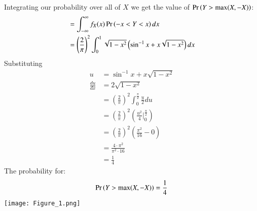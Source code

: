 \documentclass[journal,12pt,twocolumn]{IEEEtran}
\begin{document}
Integrating our probability over all of $X$ we get the value of $\Pr\left(Y>\text{max}(X,-X)\right)$:
\begin{align}
 &=\int_{-\infty}^{\infty}f_X(x)\Pr\left(-x<Y<x\right)dx\\
    &=\left(\frac{2}{\pi}\right)^2\int_0^1\sqrt{1-x^2}\left(\sin^{-1}{x} + x\sqrt{1-x^2}\right)dx
\end{align}
Substituting
\begin{align} 
u &= \sin^{-1}{x} + x\sqrt{1-x^2}\\
\frac{du}{dx} &= 2\sqrt{1-x^2}\\
&=\left(\frac{2}{\pi}\right)^2\int_0^{\frac{\pi}{2}}\frac{u}{2}du\\
&=\left(\frac{2}{\pi}\right)^2\left(\frac{u^2}{4} \bigg |_0^{\frac{\pi}{2}}\right)\\
&=\left(\frac{2}{\pi}\right)^2\left(\frac{\pi^2}{16} - 0\right)\\
    &=\frac{4\cdot{\pi}^2}{{\pi}^2\cdot16}\\
    &=\frac{1}{4}
\end{align}
The probability for:
\begin{align}
    \Pr\left(Y>\text{max}(X,-X)\right) = \frac{1}{4}
\end{align}
\texttt{[image: Figure\_1.png]}
\end{document}
